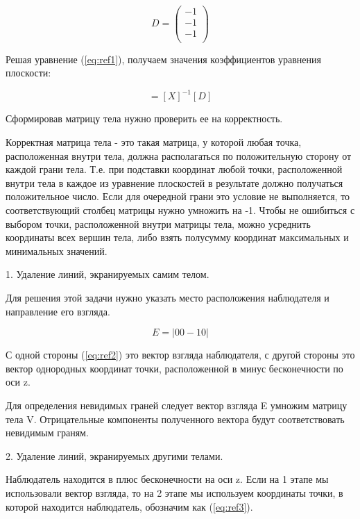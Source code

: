 ~

\begin{equation}
	D = \left(
	\begin{array}{c}
			-1 \\
			-1 \\
			-1 \\
		\end{array}
	\right)
\end{equation}

Решая уравнение (\ref{eq:ref1}), получаем значения коэффициентов уравнения плоскости: 

\begin{equation}
	[C] = [X]^{-1}[D]	
\end{equation}

Сформировав матрицу тела нужно проверить ее на корректность. 

Корректная матрица тела - это такая матрица, у которой любая точка, расположенная внутри тела, должна располагаться по положительную сторону от каждой грани тела. Т.е. при подставки координат любой точки, расположенной внутри тела в каждое из уравнение плоскостей в результате должно получаться положительное число. Если для очередной грани это условие не выполняется, то соответствующий столбец матрицы нужно умножить на -1. Чтобы не ошибиться с выбором точки, расположенной внутри матрицы тела, можно усреднить координаты всех вершин тела, либо взять полусумму координат максимальных и минимальных значений.

1. Удаление линий, экранируемых самим телом.

Для решения этой задачи нужно указать место расположения наблюдателя и направление его взгляда.

\begin{equation}
	E = |00-10|
	\label{eq:ref2}
\end{equation}

С одной стороны (\ref{eq:ref2}) это вектор взгляда наблюдателя, с другой стороны это вектор однородных координат точки, расположенной в минус бесконечности по оси z.

Для определения невидимых граней следует вектор взгляда E умножим матрицу тела V. Отрицательные компоненты полученного вектора будут соответствовать невидимым граням.

2. Удаление линий, экранируемых другими телами.

Наблюдатель находится в плюс бесконечности на оси z. Если на 1 этапе мы использовали вектор взгляда, то на 2 этапе мы используем координаты точки, в которой находится наблюдатель, обозначим как (\ref{eq:ref3}).

